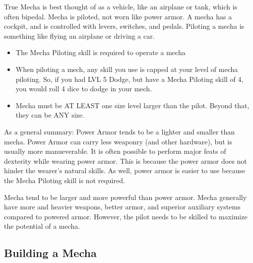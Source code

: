 \documentclass[twoside]{book}
\begin{document}
    {  
      True Mecha is best thought of as a vehicle, like an
             airplane or tank, which is often bipedal. Mecha is piloted,
             not worn like power armor. A mecha has a cockpit, and is
             controlled with levers, switches, and pedals. Piloting a
             mecha is something like flying an airplane or driving a car.
             
    }
  
\begin{itemize}
      
  \item  The Mecha Piloting skill is required to operate a
               mecha 
  \item  When piloting a mech, any skill you use is capped at
               your level of mecha piloting. So, if you had LVL 5 Dodge,
               but have a Mecha Piloting skill of 4, you would roll 4
               dice to dodge in your mech. 
  \item  Mecha must be AT LEAST one size level larger than
               the pilot. Beyond that, they can be ANY size. 
\end{itemize}
  
    {  
      As a general summary: Power Armor tends to be a
             lighter and smaller than mecha. Power Armor can carry less
             weaponry (and other hardware), but is usually more
             manueverable. It is often possible to perform major feats of
             dexterity while wearing power armor. This is because the
             power armor does not hinder the wearer's natural
             skills. As well, power armor is easier to use because the
             Mecha Piloting skill is not required. 
    }
  
    {  
      Mecha tend to be larger and more powerful than power
             armor. Mecha generally have more and heavier weapons, better
             armor, and superior auxiliary systems compared to powered
             armor. However, the pilot needs to be skilled to maximize
             the potential of a mecha. 
    }
  
    

\subsection{Building a Mecha}
    
\end{document}

